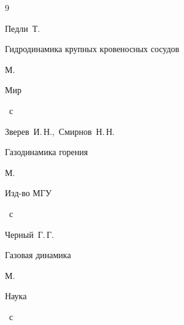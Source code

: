 \begin{thebibliography}{9}

\by Педли~Т.

\book Гидродинамика крупных кровеносных сосудов

\publaddr М.

\publ Мир


~с




\by Зверев~И.\,Н.,~Смирнов~Н.\,Н.

\book Газодинамика горения

\publaddr М.

\publ Изд-во МГУ


~с






\by Черный~Г.\,Г.

\book Газовая динамика

\publaddr М.

\publ Наука


~с





\end{thebibliography}







\newpage










\makeengtitlem

\newpage

